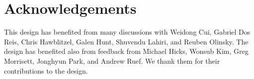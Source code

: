 \section{Acknowledgements}

This design has benefited from many discussions with Weidong Cui, Gabriel Dos Reis, 
Chris Hawblitzel, Galen Hunt, Shuvendu Lahiri, and Reuben Olinsky.  The design has
benefited also from feedback from Michael Hicks, Wonsub Kim, Greg Morrisett, Jonghyun
Park, and Andrew Ruef. We thank them for their contributions to the design.


